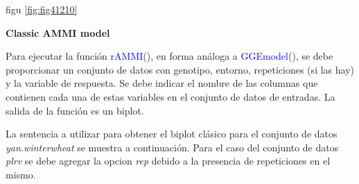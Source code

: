 \begin{itemize}[wide, nosep, labelindent = 0pt, topsep = 1ex, noitemsep,topsep=0pt]
figu \ref{fig:fig41210}


\end{itemize}


\textbf{Classic AMMI model}

Para ejecutar la función \textcolor{blue}{rAMMI}(), en forma análoga a \textcolor{blue}{GGEmodel}(), se debe proporcionar un conjunto de datos con genotipo, entorno, repeticiones (si las hay) y la variable de respuesta. Se debe indicar el nombre de las columnas que contienen cada una de estas variables en el conjunto de datos de entradas. La salida de la función es un biplot.

La sentencia a utilizar para obtener el biplot clásico para el conjunto de datos \emph{yan.winterwheat} se muestra a continuación. Para el caso del conjunto de datos \emph{plrv} se debe agregar la opcion \emph{rep} debido a la presencia de repeticiones en el mismo.



